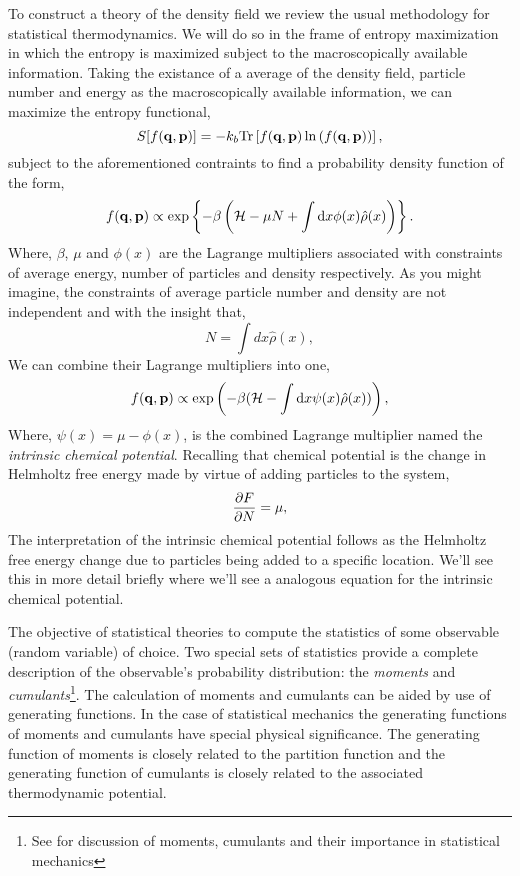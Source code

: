 To construct a theory of the density field we review the usual methodology for
statistical thermodynamics. We will do so in the frame of entropy maximization
in which the entropy is maximized subject to the macroscopically available
information. Taking the existance of a average of the density field, particle
number and energy as the macroscopically available information, we can maximize
the entropy functional,
%
\begin{equation}
    S[f(\mathbf{q}, \mathbf{p})] = -k_b \mathrm{Tr}\left[ f(\mathbf{q}, \mathbf{p})\ln\left(f(\mathbf{q}, \mathbf{p})\right) \right], 
\end{equation}
%
subject to the aforementioned contraints to find a probability density function
of the form,
%
\begin{equation} 
    f(\mathbf{q}, \mathbf{p}) \propto \exp\left\lbrace-\beta \left(\mathcal{H} -\mu N + \int \mathrm{d}x
        \phi(x)\hat{\rho}(x)\right)\right\rbrace.
\end{equation}
%
Where, $\beta$, $\mu$ and $\phi(x)$ are the Lagrange multipliers associated
with constraints of average energy, number of particles and density
respectively. As you might imagine, the constraints of average particle number
and density are not independent and with the insight that,
%
\begin{equation}
    N = \int dx \hat{\rho}(x),
\end{equation}
%
We can combine their Lagrange multipliers into one,
%
\begin{equation}
    f(\mathbf{q}, \mathbf{p}) \propto \exp\left(- \beta(\mathcal{H} - \int \mathrm{d}x \psi(x)
        \hat{\rho}(x))\right),
\end{equation}
%
Where, $\psi(x) = \mu - \phi(x)$, is the combined Lagrange multiplier named
the \textit{intrinsic chemical potential}. Recalling that chemical potential is
the change in Helmholtz free energy made by virtue of adding particles to the
system,
%
\begin{equation}
    \label{eq:chem_potential} 
    \frac{\partial F}{\partial N} = \mu,
\end{equation}
%
The interpretation of the intrinsic chemical potential follows as the Helmholtz
free energy change due to particles being added to a specific location.  We'll
see this in more detail briefly where we'll see a analogous equation for the
intrinsic chemical potential.

The objective of statistical theories to compute the statistics of some
observable (random variable) of choice. Two special sets of statistics provide
a complete description of the observable's probability distribution: the
\textit{moments} and \textit{cumulants}\footnote{See \cite{KUBO62} for
discussion of moments, cumulants and their importance in statistical
mechanics}.  The calculation of moments and cumulants can be aided by use of
generating functions. In the case of statistical mechanics the generating
functions of moments and cumulants have special physical significance. The
generating function of moments is closely related to the partition function and
the generating function of cumulants is closely related to the associated
thermodynamic potential. 

